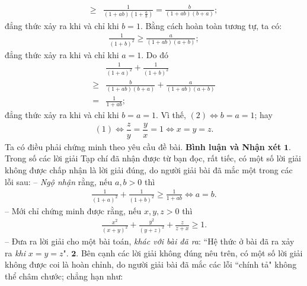 \begin{multicols}{2}
\begin{align*}
		\ge &\frac{1}{{\left( {1 + ab} \right)\left( {1 + \frac{a}{b}} \right)}}= \frac{b}{{\left( {1 + ab} \right)\left( {b + a} \right)}};
	\end{align*}
	đẳng thức xảy ra khi và chỉ khi $b = 1$.
	\vskip 0.05cm
	Bằng cách hoàn toàn tương tự, ta có:
	\begin{align*}
		\frac{1}{{{{\left( {1 + b} \right)}^2}}} \ge \frac{a}{{\left( {1 + ab} \right)\left( {a + b} \right)}};
	\end{align*}
	đẳng thức xảy ra khi và chỉ khi $a = 1$.
	\vskip 0.05cm
	Do đó
	\begin{align*}
		&\frac{1}{{{{\left( {1 + a} \right)}^2}}} + \frac{1}{{{{\left( {1 + b} \right)}^2}}} \\[-0.4ex]
		\ge &\frac{b}{{\left( {1 + ab} \right)\left( {b + a} \right)}} + \frac{a}{{\left( {1 + ab} \right)\left( {a + b} \right)}} \\[-0.4ex]
		= &\frac{1}{{1 + ab}};
	\end{align*}
	đẳng thức xảy ra khi và chỉ khi $b = a = 1$.
	\vskip 0.05cm
	Vì thế, $(2) \Leftrightarrow b = a = 1$; hay
	\begin{align*}
		(1)  \Leftrightarrow  \dfrac{z}{y} = \dfrac{y}{x} = 1  \Leftrightarrow  x = y = z.
	\end{align*}
	Ta có điều phải chứng minh theo yêu cầu đề bài.
	\vskip 0.05cm
	\textbf{\color{thachthuctoanhoc}Bình luận và Nhận xét}
	\vskip 0.05cm
	$\pmb{1.}$ Trong số các lời giải Tạp chí đã nhận được từ bạn đọc, rất tiếc, có một số lời giải không được chấp nhận là lời giải đúng, do người giải bài đã mắc một trong các lỗi sau:
	\vskip 0.05cm
	-- \textit{Ngộ nhận} rằng, nếu $a, b > 0$ thì
	\begin{align*}
		\frac{1}{{{{\left( {1 \!+\! a} \right)}^2}}} \!+\! \frac{1}{{{{\left( {1 \!+\! b} \right)}^2}}} \!\ge\! \frac{1}{{1 \!+\! ab}} \!\Leftrightarrow\! a \!=\!b.
	\end{align*}
	-- Mới chỉ chứng minh được rằng, nếu $x, y, z > 0$ thì
	\begin{align*}
		\frac{{{x^2}}}{{{{\left( {x + y} \right)}^2}}} + \frac{{{y^2}}}{{{{\left( {y + z} \right)}^2}}} + \frac{z}{{z + x}} \ge 1.
	\end{align*}
	-- Đưa ra lời giải cho một bài toán, \textit{khác với bài đã ra}: ``Hệ thức ở bài đã ra xảy ra \textit{khi} $x = y = z$".
	\vskip 0.05cm
	$\pmb{2.}$ Bên cạnh các lời giải không đúng nêu trên, có một số lời giải không được coi là hoàn chỉnh, do người giải bài đã mắc các lỗi ``chính tả" không thể châm chước; chẳng hạn như:
	\begin{align*}

\end{align*}
\end{multicols}
